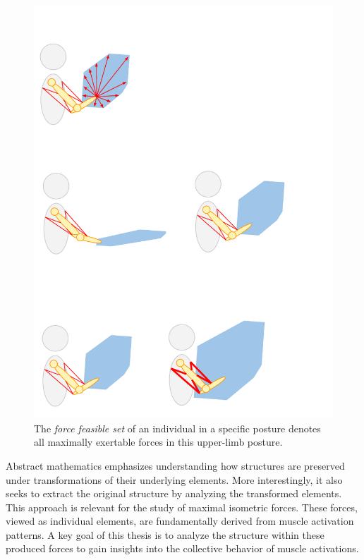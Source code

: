\begin{figure}[!htb]
    \captionsetup{justification=centering}
        \centering
        \includegraphics[trim={0 370 250 40},clip,width=0.3\linewidth]{img/chapter_1/ffs_characteristics.pdf}
    \caption{The \emph{force feasible set} of an individual in a specific posture denotes all maximally exertable forces in this upper-limb posture.}
    \label{fig:ffs_simple}
\end{figure}

Abstract mathematics emphasizes understanding how structures are preserved under transformations of their underlying elements. More interestingly, it also seeks to extract the original structure by analyzing the transformed elements. This approach is relevant for the study of maximal isometric forces. These forces, viewed as individual elements, are fundamentally derived from muscle activation patterns. A key goal of this thesis is to analyze the structure within these produced forces to gain insights into the collective behavior of muscle activations.

